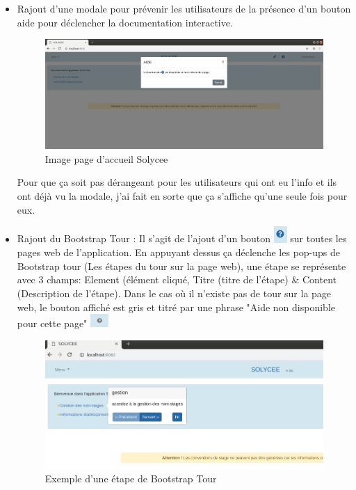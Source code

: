 \documentclass[12pt]{article}
\begin{document}
\begin{itemize}
\item Rajout d'une modale pour prévenir les utilisateurs de la présence d'un bouton aide pour déclencher la documentation interactive.

\begin{figure}[H]
	\centering
 		\includegraphics[width=1\textwidth]{diagrammes/aide_modal.png}
  		\caption{Image page d'accueil Solycee}
	\end{figure}

Pour que ça soit pas dérangeant pour les utilisateurs qui ont eu l'info et ils ont déjà vu la modale, j'ai fait en sorte que ça s'affiche qu'une seule fois pour eux.

\item Rajout du Bootstrap Tour : Il s'agit de l'ajout d'un bouton \includegraphics[width=5mm,scale=0.5]{diagrammes/Bouton_aideDispo.png} sur toutes les pages web de l'application. En appuyant dessus ça déclenche les pop-ups  de Bootstrap tour (Les étapes du tour sur la page web), une étape se représente avec 3 champs: Element (élément cliqué, Titre (titre de l'étape) \& Content (Description de l'étape). Dans le cas où il n'existe pas de tour sur la page web, le bouton affiché est gris et titré par une phrase "Aide non disponible pour cette page" \includegraphics[width=7mm,scale=0.5]{diagrammes/Bouton_aideNonDispo.png}

\begin{figure}[H]
	\centering
 		\includegraphics[width=1\textwidth]{diagrammes/exemple_Tour.png}
  		\caption{Exemple d'une étape de Bootstrap Tour}
	\end{figure}


\end{itemize}
\end{document}
